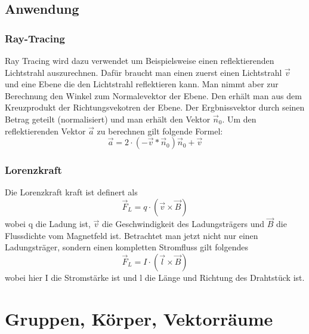 \documentclass[a4paper,10pt]{scrartcl}
\begin{document}
        \subsection{Anwendung}
            \subsubsection{Ray-Tracing}
                Ray Tracing wird dazu verwendet um Beispielsweise einen reflektierenden Lichtstrahl auszurechnen. Dafür braucht man einen zuerst einen Lichtstrahl $\vec{v}$ und eine Ebene die den 
                Lichtstrahl reflektieren kann.  Man nimmt aber zur Berechnung den Winkel zum Normalevektor der Ebene. Den erhält man aus dem Kreuzprodukt der Richtungsvekotren der Ebene. 
                Der Ergbnissvektor durch seinen Betrag geteilt (normalisiert) und man erhält den Vektor $\vec{n}_0$. Um den reflektierenden Vektor $\vec{a}$ zu berechnen gilt folgende Formel:
                \[
                    \vec{a} = 2 \cdot (-\vec{v} * \vec{n}_0) \vec{n}_0 + \vec{v}
                \]   
            \subsubsection{Lorenzkraft}
            Die Lorenzkraft kraft ist definert als
            \[\vec{F}_L = q \cdot (\vec{v} \times \vec{B})\] 
            wobei q die Ladung ist, $\vec{v}$ die Geschwindigkeit des Ladungsträgers und
            $\vec{B}$ die Flussdichte vom Magnetfeld ist. Betrachtet man jetzt nicht nur einen Ladungsträger, sondern einen kompletten Stromfluss gilt folgendes 
            \[\vec{F}_L = I  \cdot (\vec{l} \times \vec{B})\]
            wobei hier I die Stromstärke ist und l die Länge und Richtung des Drahtstück ist.
    \newpage
    \section{Gruppen, Körper, Vektorräume}
\end{document}
